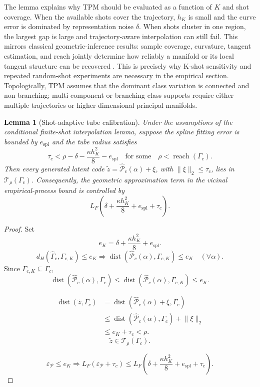 \documentclass{article}
\newtheorem{lemma}{Lemma}
\begin{document}
The lemma explains why TPM should be evaluated as a function of $K$ and shot coverage. When the available shots cover the trajectory, $h_K$ is small and the curve error is dominated by representation noise $\delta$. When shots cluster in one region, the largest gap is large and trajectory-aware interpolation can still fail. This mirrors classical geometric-inference results: sample coverage, curvature, tangent estimation, and reach jointly determine how reliably a manifold or its local tangent structure can be recovered \citep{niyogi2008finding, genovese2012manifold, aamari2019nonasymptotic}. This is precisely why K-shot sensitivity and repeated random-shot experiments are necessary in the empirical section. Topologically, TPM assumes that the dominant class variation is connected and non-branching; multi-component or branching class supports require either multiple trajectories or higher-dimensional principal manifolds.

\begin{lemma}[Shot-adaptive tube calibration]
	Under the assumptions of the conditional finite-shot interpolation lemma, suppose the spline fitting error is bounded by $e_{\mathrm{spl}}$ and the tube radius satisfies
	\[
		\tau_c
		<
		\rho-\delta-\frac{\kappa h_K^2}{8}-e_{\mathrm{spl}}
		\quad\text{for some}\quad
		\rho<\operatorname{reach}(\Gamma_c).
	\]
	Then every generated latent code $\tilde z=\widehat{\mathcal{P}}_c(\alpha)+\xi$, with $\lVert\xi\rVert_2\le\tau_c$, lies in $\mathcal{T}_\rho(\Gamma_c)$. Consequently, the geometric approximation term in the vicinal empirical-process bound is controlled by
	\[
		L_F\left(\delta+\frac{\kappa h_K^2}{8}+e_{\mathrm{spl}}+\tau_c\right).
	\]
\end{lemma}

\begin{proof}
	Set
	\[
	e_K=\delta+\frac{\kappa h_K^2}{8}+e_{\mathrm{spl}}.
	\]
	\[
	d_H(\widehat{\Gamma}_c,\Gamma_{c,K})\le e_K
	\Longrightarrow
	\operatorname{dist}(\widehat{\mathcal{P}}_c(\alpha),\Gamma_{c,K})\le e_K
	\quad(\forall\alpha).
	\]
	Since $\Gamma_{c,K}\subseteq\Gamma_c$,
	\[
	\operatorname{dist}(\widehat{\mathcal{P}}_c(\alpha),\Gamma_c)
	\le
	\operatorname{dist}(\widehat{\mathcal{P}}_c(\alpha),\Gamma_{c,K})
	\le e_K .
	\]

	\[
	\begin{aligned}
	\operatorname{dist}(\tilde z,\Gamma_c)
	&=
	\operatorname{dist}(\widehat{\mathcal{P}}_c(\alpha)+\xi,\Gamma_c)\\
	&\le
	\operatorname{dist}(\widehat{\mathcal{P}}_c(\alpha),\Gamma_c)+\lVert\xi\rVert_2\\
	&\le
	e_K+\tau_c
	<
	\rho .
	\end{aligned}
	\]
	\[
	\tilde z\in\mathcal{T}_\rho(\Gamma_c).
	\]

	\[
	\varepsilon_{\mathcal{P}}\le e_K
	\Longrightarrow
	L_F(\varepsilon_{\mathcal{P}}+\tau_c)
	\le
	L_F\left(\delta+\frac{\kappa h_K^2}{8}+e_{\mathrm{spl}}+\tau_c\right).
	\]
\end{proof}
\end{document}
